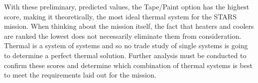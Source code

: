With these preliminary, predicted values, the Tape/Paint option has the highest score, making it theoretically, the most ideal thermal system for the STARS mission.  When thinking about the mission itself, the fact that heaters and coolers are ranked the lowest does not necessarily eliminate them from consideration.  Thermal is a system of systems and so no trade study of single systems is going to determine a perfect thermal solution. Further analysis must be conducted to confirm these scores and determine which combination of thermal systems is best to meet the requirements laid out for the mission. 

